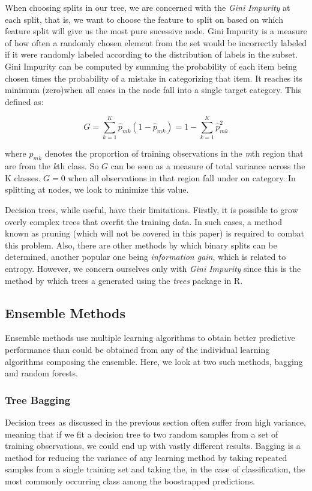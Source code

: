 \documentclass[preprint,12pt]{elsarticle}
\begin{document}
When choosing splits in our tree, we are concerned with the \textit{Gini Impurity} at each split, that is, we want to choose the feature to split on based on which feature split will give us the most pure sucessive node. Gini Impurity is a measure of how often a randomly chosen element from the set would be incorrectly labeled if it were randomly labeled according to the distribution of labels in the subset. Gini Impurity can be computed by summing the probability of each item being chosen times the probability of a mistake in categorizing that item. It reaches its minimum (zero)when all cases in the node fall into a single target category. This defined as:

$$G = \sum\limits_{k=1}^K \hat{p}_{mk}(1-\hat{p}_{mk}) = 1 - \sum\limits_{k=1}^K \hat{p}_{mk}^{2}$$

\noindent where $\hat{p}_{mk}$ denotes the proportion of training observations in the \textit{m}th region that are from the \textit{k}th class. So $G$ can be seen as a measure of total variance across the K classes. $G = 0$ when all observations in that region fall under on category. In splitting at nodes, we look to minimize this value.

Decision trees, while useful, have their limitations. Firstly, it is possible to grow overly complex trees that overfit the training data. In such cases, a method known as pruning (which will not be covered in this paper) is required to combat this problem. Also, there are other methods by which binary splits can be determined, another popular one being \textit{information gain}, which is related to entropy. However, we concern ourselves only with \textit{Gini Impurity} since this is the method by which trees a generated using the \textit{trees} package in R.


\subsection{Ensemble Methods}
Ensemble methods use multiple learning algorithms to obtain better predictive performance than could be obtained from any of the individual learning algorithms composing the ensemble. Here, we look at two such methods, bagging and random forests.
\subsubsection{Tree Bagging}
Decision trees as discussed in the previous section often suffer from high variance, meaning that if we fit a decision tree to two random samples from a set of training observations, we could end up with vastly different results. Bagging is a method for reducing the variance of any learning method by taking repeated samples from a single training set and taking the, in the case of classification, the most commonly occurring class among the boostrapped predictions. 
\end{document}
